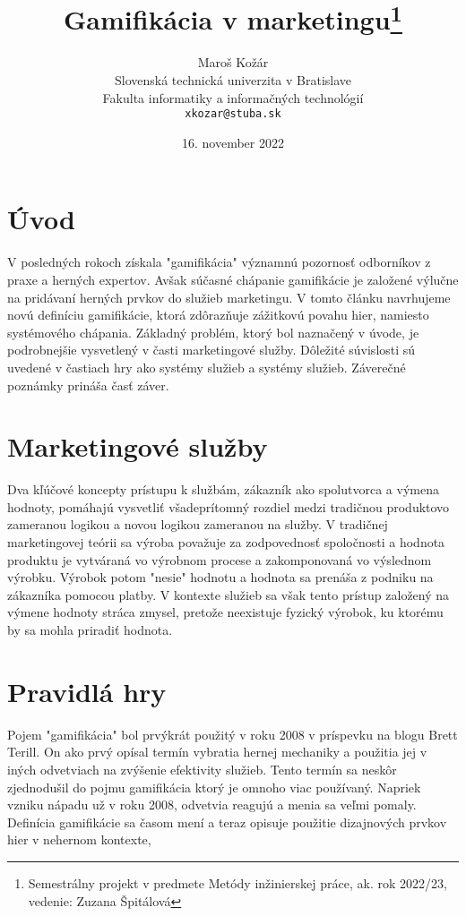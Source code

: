\documentclass[10pt,twoside,slovak,a4paper]{article}
\title{Gamifikácia v marketingu\thanks{Semestrálny projekt v predmete Metódy inžinierskej práce, ak. rok 2022/23, vedenie: Zuzana Špitálová}}
\author{Maroš Kožár\\[2pt]
	{\small Slovenská technická univerzita v Bratislave}\\
	{\small Fakulta informatiky a informačných technológií}\\
	{\small \texttt{xkozar@stuba.sk}}
	}
\date{\small 16. november 2022}
\begin{document}
\maketitle
\section{Úvod}
V posledných rokoch získala "gamifikácia" významnú pozornosť odborníkov z praxe a herných expertov.
Avšak súčasné chápanie gamifikácie je založené výlučne na pridávaní herných prvkov do služieb marketingu.
V tomto článku navrhujeme novú definíciu gamifikácie, ktorá zdôrazňuje zážitkovú povahu hier, namiesto systémového chápania.
Základný problém, ktorý bol naznačený v úvode, je podrobnejšie vysvetlený v časti marketingové služby.
Dôležité súvislosti sú uvedené v častiach hry ako systémy služieb a systémy služieb.
Záverečné poznámky prináša časť záver.



\section{Marketingové služby} \label{nejaka}


\begin{figure*}[tbh]
Dva kľúčové koncepty prístupu k službám, zákazník ako spolutvorca a výmena hodnoty, pomáhajú vysvetliť všadeprítomný rozdiel medzi tradičnou produktovo zameranou logikou a novou  logikou zameranou na služby.
V tradičnej marketingovej teórii sa výroba považuje za zodpovednosť spoločnosti
a hodnota produktu je vytváraná vo výrobnom procese a zakomponovaná vo výslednom výrobku. Výrobok potom "nesie"
hodnotu a hodnota sa prenáša z podniku na
zákazníka pomocou platby. V kontexte služieb sa však tento
prístup založený na výmene hodnoty stráca zmysel, pretože neexistuje
fyzický výrobok, ku ktorému by sa mohla priradiť hodnota.
\end{figure*}



\section{Pravidlá hry} \label{ina}

Pojem "gamifikácia" bol prvýkrát použitý v roku 2008 v príspevku na blogu
Brett Terill. On ako prvý opísal termín vybratia hernej mechaniky a použitia jej v iných odvetviach na zvýšenie efektivity služieb. Tento termín sa neskôr zjednodušil do pojmu gamifikácia ktorý je omnoho viac používaný. Napriek vzniku nápadu už v roku 2008, odvetvia reagujú a menia sa veľmi pomaly. Definícia gamifikácie sa časom mení a teraz opisuje použitie dizajnových prvkov hier v nehernom kontexte, 
\end{document}

